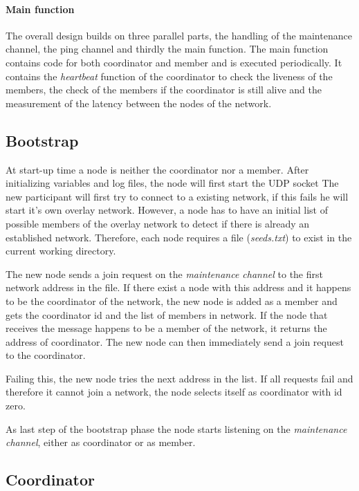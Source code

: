\documentclass[paper=a4, fontsize=11pt]{scrartcl} %
\numberwithin{equation}{section} %
\numberwithin{figure}{section} %
\numberwithin{table}{section} %
\begin{document}
\paragraph{Main function}
The overall design builds on three parallel parts, the handling of the maintenance channel, the ping channel and thirdly the main function. The main function contains code for both coordinator and member and is executed periodically. It contains the \textit{heartbeat} function of the coordinator to check the liveness of the members, the check of the members if the coordinator is still alive and the measurement of the latency between the nodes of the network.


\subsection{Bootstrap}

At start-up time a node is neither the coordinator nor a member. After initializing variables and log files, the node will first start the UDP socket The new participant will first try to connect to a existing network, if this fails he will start it's own overlay network. However, a node has to have an initial list of possible members of the overlay network to detect if there is already an established network. Therefore, each node requires a file (\textit{seeds.txt}) to exist in the current working directory. 

The new node sends a join request on the \textit{maintenance channel} to the first network address in the file. If there exist a node with this address and it happens to be the coordinator of the network, the new node is added as a member and gets the coordinator id and the list of members in network. If the node that receives the message happens to be a member of the network, it returns the address of coordinator. The new node can then immediately send a join request to the coordinator.

Failing this, the new node tries the next address in the list. If all requests fail and therefore it cannot join a network, the node selects itself as coordinator with id zero.

As last step of the bootstrap phase the node starts listening on the \textit{maintenance channel}, either as coordinator or as member.

\subsection{Coordinator}
\end{document}

